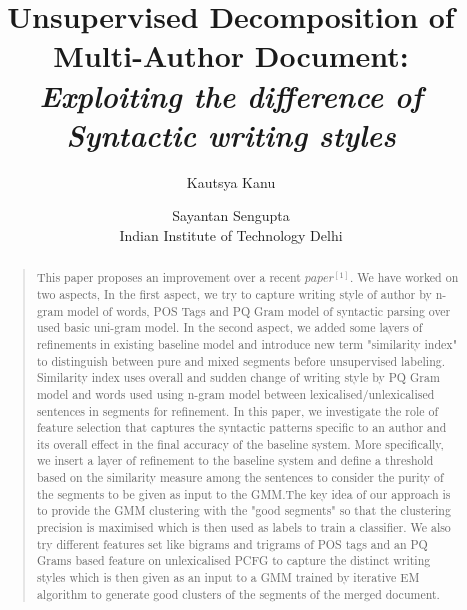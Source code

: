 \documentclass[letterpaper]{article}
\begin{document}
%
\title{Unsupervised Decomposition of Multi-Author Document:\\\textit{Exploiting the difference of Syntactic writing styles}}
\author{Kautsya Kanu \and   Sayantan Sengupta\\ 
Indian Institute of Technology Delhi\\
}
\maketitle

 \begin{abstract}
 \begin{quote}
This paper proposes an improvement over a recent $paper^{[1]}$. We have worked on two aspects, In the first aspect, we try to capture writing style of author by n-gram model of words, POS Tags and PQ Gram model of syntactic parsing over used basic uni-gram model. In the second aspect, we added some layers of refinements in existing baseline model and introduce new term "similarity index" to distinguish between pure and mixed segments before unsupervised labeling. Similarity index uses overall and sudden change of writing style by PQ Gram model and words used using n-gram model between lexicalised/unlexicalised sentences in segments for refinement. 
In this paper, we investigate the role of feature  selection  that captures the syntactic patterns specific to an author and its overall effect in the final accuracy of the baseline system. More specifically, we insert a layer of refinement to the baseline system and define a threshold based on the similarity measure among the sentences to consider the purity of the segments to be given as input to the GMM.The key idea of our approach is to provide the GMM clustering with the "good segments" so that the clustering precision is maximised which is then used as labels to train a classifier. We also try different features set like bigrams and trigrams of POS tags and an PQ Grams based feature on unlexicalised PCFG to capture the distinct writing styles which is then given as an input to a GMM trained by  iterative EM algorithm to generate good clusters of the segments of the merged document.
 \end{quote}
 \end{abstract}
\end{document}
